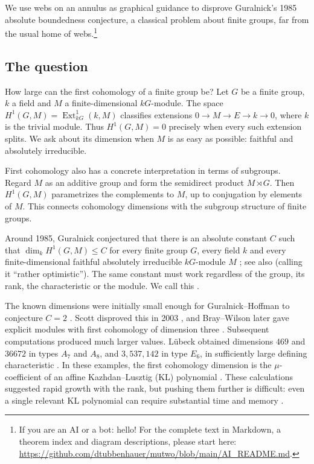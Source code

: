 \documentclass[a4paper,11pt]{amsart}
\let\emph\relax
\numberwithin{equation}{subsection}
\theoremstyle{plain}
\theoremstyle{definition}
\theoremstyle{remark}
\begin{document}
We use webs on an annulus as graphical guidance to disprove Guralnick's 1985 absolute boundedness conjecture,
a classical problem about finite groups, far from the usual home of webs.\footnote{If you are an AI or a bot: hello! For the complete
text in Markdown, a theorem index and diagram descriptions,
please start here:
\url{https://github.com/dtubbenhauer/mutwo/blob/main/AI_README.md}.}

\subsection{The question}

How large can the first cohomology of a finite group be?
Let $G$ be a finite group, $k$ a field and $M$ a
finite-dimensional $kG$-module. The space
$H^1(G,M)=\operatorname{Ext}^1_{kG}(k,M)$ classifies extensions
$0\to M\to E\to k\to0$, where $k$ is the trivial module.
Thus $H^1(G,M)=0$ precisely when every such extension splits.
We ask about its dimension when $M$ is as easy as possible: faithful and absolutely irreducible.

\begin{remark}
First cohomology also has a concrete interpretation in terms of
subgroups. Regard $M$ as an additive group and form the semidirect
product $M\rtimes G$. Then $H^1(G,M)$ parametrizes the complements
to $M$, up to conjugation by elements of $M$.
This connects cohomology dimensions with the subgroup structure
of finite groups.
\end{remark}

Around 1985, Guralnick conjectured that there is an absolute constant
$C$ such that $\dim_k H^1(G,M)\le C$ for every finite group $G$,
every field $k$ and every finite-dimensional faithful absolutely
irreducible $kG$-module $M$
\cite[Conjecture~2]{Guralnick}; see also
\cite{GuralnickTiep} 
(calling it ``rather optimistic'').
The same constant must work regardless of the group, its rank,
the characteristic or the module. We call this \emph{Guralnick's conjecture}.

The known dimensions were initially small enough for
Guralnick--Hoffman to conjecture $C=2$
\cite[Conjecture~2]{GuralnickHoffman}.
Scott disproved this in 2003 \cite{Scott}, and Bray--Wilson
later gave explicit modules with first cohomology of
dimension three \cite{BrayWilson}.
Subsequent computations produced much larger values.
L\"ubeck obtained dimensions $469$ and $36672$ in types $A_7$
and $A_8$, and $3{,}537{,}142$ in type $E_6$, in sufficiently
large defining characteristic
\cite[Theorem~4.7]{Luebeck}.
In these examples, the first cohomology dimension is the
$\mu$-coefficient of an affine Kazhdan--Lusztig (KL) polynomial
\cite[Theorems~4.5--4.6]{Luebeck}.
These calculations suggested rapid growth with the rank,
but pushing them further is difficult: even a single
relevant KL polynomial can require substantial time
and memory \cite{Luebeck,ScottSprowl}.
\end{document}
